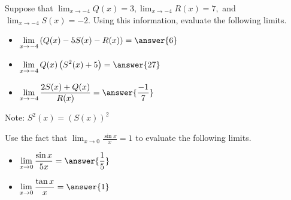 \documentclass[handout]{ximera}
\begin{document}
\begin{exercise}

Suppose that $\displaystyle\lim_{x \to -4} Q(x) = 3, \displaystyle\lim_{x\to -4} R(x) = 7,$ and $\displaystyle\lim_{x\to -4} S(x) = -2$.  Using this information, evaluate the following limits. 

\begin{itemize}

\item $\displaystyle\lim_{x \to -4} \left( Q(x) -5S(x) - R(x) \right) = \answer{6}$

\item $\displaystyle\lim_{x \to -4} Q(x)\left(S^2(x) + 5 \right) = \answer{27}$

\item $\displaystyle\lim_{x \to -4} \frac{2S(x) + Q(x)}{R(x)} = \answer{\frac{-1}{7}}$

\end{itemize}

\begin{hint}

Note: $S^2(x) = (S(x))^2$

\end{hint}

\end{exercise}

\begin{exercise}

Use the fact that $\displaystyle\lim_{x \to 0} \frac{\sin x}{x} = 1$ to evaluate the following limits. 

\begin{itemize}

\item $\displaystyle\lim_{x \to 0} \frac{ \sin x}{5x} = \answer{\frac{1}{5}}$

\item $\displaystyle\lim_{x \to 0} \frac{\tan x}{x} = \answer{1}$

\end{itemize}
\end{exercise}
\end{document}
